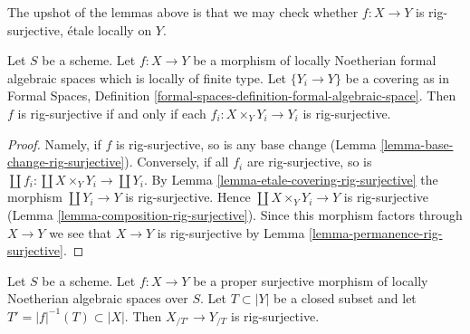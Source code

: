 \noindent
The upshot of the lemmas above is that we may check whether
$f : X \to Y$ is rig-surjective, \'etale locally on $Y$.

\begin{lemma}
\label{lemma-upshot}
Let $S$ be a scheme. Let $f : X \to Y$ be a morphism of locally
Noetherian formal algebraic spaces which is locally of finite type.
Let $\{Y_i \to Y\}$ be a covering as in
Formal Spaces, Definition
\ref{formal-spaces-definition-formal-algebraic-space}.
Then $f$ is rig-surjective if and only if
each $f_i : X \times_Y Y_i \to Y_i$ is
rig-surjective.
\end{lemma}

\begin{proof}
Namely, if $f$ is rig-surjective, so is any base change
(Lemma \ref{lemma-base-change-rig-surjective}).
Conversely, if all $f_i$ are rig-surjective, so is
$\coprod f_i : \coprod X \times_Y Y_i \to \coprod Y_i$.
By Lemma \ref{lemma-etale-covering-rig-surjective}
the morphism $\coprod Y_i \to Y$ is rig-surjective.
Hence $\coprod X \times_Y Y_i \to Y$ is rig-surjective
(Lemma \ref{lemma-composition-rig-surjective}).
Since this morphism factors through $X \to Y$ we see that $X \to Y$
is rig-surjective by Lemma \ref{lemma-permanence-rig-surjective}.
\end{proof}

\begin{lemma}
\label{lemma-completion-proper-surjective-rig-surjective}
Let $S$ be a scheme. Let $f : X \to Y$ be a proper surjective morphism
of locally Noetherian algebraic spaces over $S$. Let $T \subset |Y|$
be a closed subset and let $T' = |f|^{-1}(T) \subset |X|$.
Then $X_{/T'} \to Y_{/T}$ is rig-surjective.
\end{lemma}

